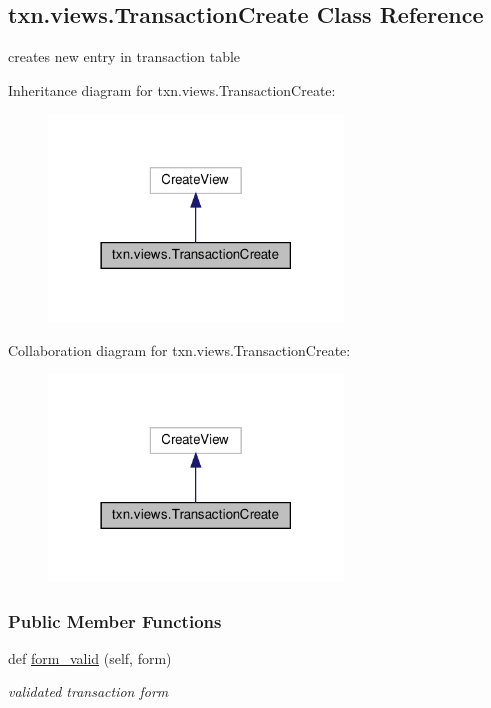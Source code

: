 \hypertarget{classtxn_1_1views_1_1TransactionCreate}{}\subsection{txn.\+views.\+Transaction\+Create Class Reference}
\label{classtxn_1_1views_1_1TransactionCreate}


creates new entry in transaction table  




Inheritance diagram for txn.\+views.\+Transaction\+Create\+:\nopagebreak
\begin{figure}[H]
\begin{center}
\leavevmode
\includegraphics[width=222pt]{classtxn_1_1views_1_1TransactionCreate__inherit__graph}
\end{center}
\end{figure}


Collaboration diagram for txn.\+views.\+Transaction\+Create\+:\nopagebreak
\begin{figure}[H]
\begin{center}
\leavevmode
\includegraphics[width=222pt]{classtxn_1_1views_1_1TransactionCreate__coll__graph}
\end{center}
\end{figure}
\subsubsection*{Public Member Functions}
\begin{DoxyCompactItemize}
\item 
def \hyperlink{classtxn_1_1views_1_1TransactionCreate_a2af449f7a40ff78175b57ce079eb6e11}{form\+\_\+valid} (self, form)
\begin{DoxyCompactList}\small\item\em validated transaction form \end{DoxyCompactList}\end{DoxyCompactItemize}
